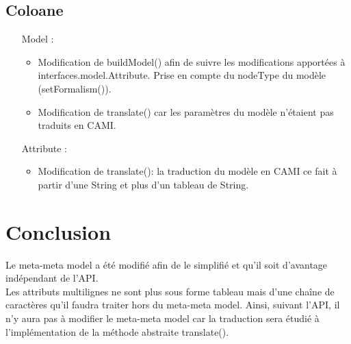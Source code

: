 \documentclass{article}
\begin{document}
\subsection{Coloane}
\begin{itemize}
	\item[Model]
		:
		\begin{itemize}
			\item Modification de buildModel() afin de suivre les modifications apport\'ees \`a interfaces.model.Attribute.
			Prise en compte du nodeType du mod\`ele (setFormalism()).
			\item Modification de translate() car les param\`etres du mod\`ele n'\'etaient pas traduits en CAMI.
		\end{itemize}

	\item[Attribute]
		:
		\begin{itemize}
			\item Modification de translate(): la traduction du mod\`ele en CAMI ce fait \`a partir d'une String et plus d'un tableau de String.
		\end{itemize}
\end{itemize}
	

\section{Conclusion}
Le meta-meta model a \'et\'e modifi\'e afin de le simplifi\'e et qu'il soit d'avantage ind\'ependant de l'API.\\

Les attributs multilignes ne sont plus sous forme tableau mais d'une cha\^ine de caract\`eres 
qu'il faudra traiter hors du meta-meta model.
Ainsi, suivant l'API, il n'y aura pas \`a modifier le meta-meta model car la traduction sera \'etudi\'e
à l'impl\'ementation de la m\'ethode abstraite translate().
\end{document}
